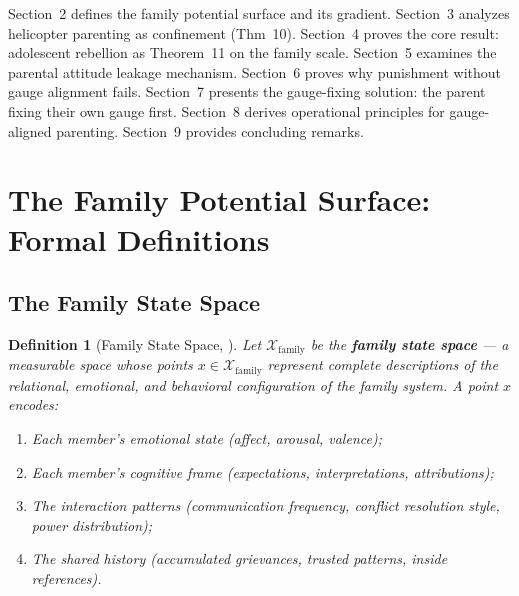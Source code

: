 \documentclass[11pt,a4paper]{article}
\newtheorem{definition}[theorem]{Definition}
\begin{document}
Section~2 defines the family potential surface and its gradient. Section~3 analyzes helicopter parenting as confinement (Thm~10). Section~4 proves the core result: adolescent rebellion as Theorem~11 on the family scale. Section~5 examines the parental attitude leakage mechanism. Section~6 proves why punishment without gauge alignment fails. Section~7 presents the gauge-fixing solution: the parent fixing their own gauge first. Section~8 derives operational principles for gauge-aligned parenting. Section~9 provides concluding remarks.

\section{The Family Potential Surface: Formal Definitions}
\label{sec:framework}

\subsection{The Family State Space}

\begin{definition}[Family State Space, \textbf{}]
\label{def:family_state}
Let $\mathcal{X}_{\text{family}}$ be the \textbf{family state space} — a measurable space whose points $x \in \mathcal{X}_{\text{family}}$ represent complete descriptions of the relational, emotional, and behavioral configuration of the family system. A point $x$ encodes:
\begin{enumerate}[label=(\roman*)]
    \item Each member's emotional state (affect, arousal, valence);
    \item Each member's cognitive frame (expectations, interpretations, attributions);
    \item The interaction patterns (communication frequency, conflict resolution style, power distribution);
    \item The shared history (accumulated grievances, trusted patterns, inside references).
\end{enumerate}
\end{definition}
\end{document}
